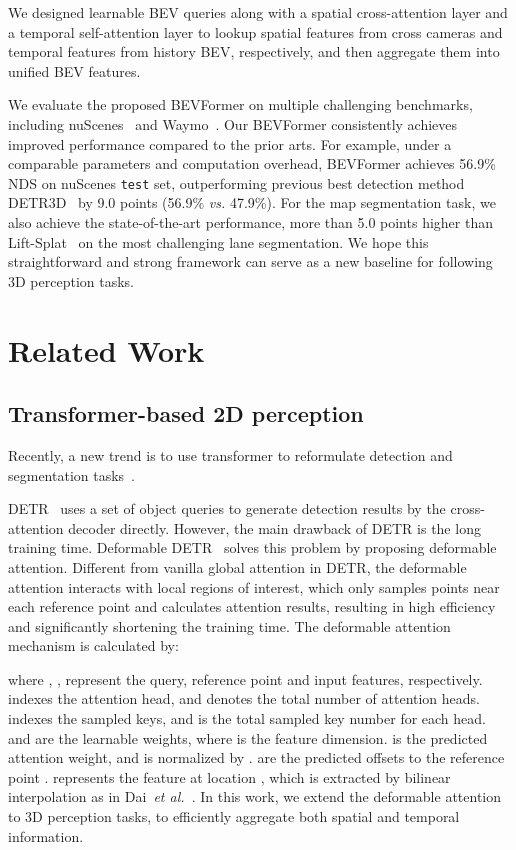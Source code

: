 \documentclass{article}
\newcommand{\etal}{\textit{et al.}}
\def\etal{{\em et al.~}}
\begin{document}
 We designed learnable BEV queries along with a spatial cross-attention layer and a temporal self-attention layer to lookup spatial features from cross cameras and temporal features from history BEV, respectively, and then aggregate them into unified BEV features.

 We evaluate the proposed BEVFormer on multiple challenging benchmarks, including nuScenes~\cite{caesar2020nuscenes} and Waymo~\cite{sun2020scalability}.
Our BEVFormer consistently achieves improved performance compared to the prior arts.
For example, under a comparable parameters and computation overhead, BEVFormer achieves 56.9\% NDS on nuScenes \texttt{test} set, outperforming previous best detection method DETR3D~\cite{wang2022detr3d} by 9.0 points (56.9\% \emph{vs.} 47.9\%). For the map segmentation task, we also achieve  the state-of-the-art performance, more than 5.0 points higher than Lift-Splat~\cite{philion2020lift} on the most challenging lane segmentation.
We hope this straightforward and strong framework can serve as a new baseline for following 3D perception tasks.

\section{Related Work}

\subsection{Transformer-based 2D perception}
Recently, a new trend is to use transformer to reformulate detection and segmentation tasks~\cite{carion2020end,zhu2020deformable,li2021panoptic}. 

DETR~\cite{carion2020end} uses a set of object queries to generate detection results by the cross-attention decoder directly.
However, the main drawback of DETR is the long training time. Deformable DETR~\cite{zhu2020deformable}  solves this problem by proposing deformable attention.
Different from vanilla global attention in DETR, the deformable attention interacts with local regions of interest, which only samples  points near each reference point and calculates attention results, resulting in high efficiency and significantly shortening the training time. The deformable attention mechanism is calculated by:

where , ,  represent the query, reference point and input features, respectively.  indexes the attention head, and  denotes the total number of attention heads.
 indexes the sampled keys, and  is the total sampled key
number for each head.
 and  are the learnable weights, where  is the feature dimension.  is the predicted attention weight, and is normalized by .  are the predicted offsets to the reference point .  represents the feature at location , which is 
extracted by bilinear interpolation as in Dai~\etal\cite{dai2017deformable}.
In this work, we extend the deformable attention to 3D perception tasks, to efficiently aggregate both spatial and temporal information.
\end{document}
